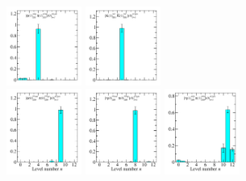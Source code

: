 \begin{figure}
  \includegraphics[width=0.22\textwidth]{figures/spectrum_a1gm/with_tq/zfactors/zfactor_isotriplet_phi_pion-A1gm_1-P001-A2p-SS_1-P00-1-A2m-SS_1.pdf}
  \includegraphics[width=0.22\textwidth]{figures/spectrum_a1gm/with_tq/zfactors/zfactor_isotriplet_kaon_kbar-A1gm_1-P001-A2-SS_1-P00-1-A2-SS_1.pdf}\\
  \includegraphics[width=0.22\textwidth]{figures/spectrum_a1gm/with_tq/zfactors/zfactor_isotriplet_phi_pion-A1gm_1-P000-T1um-SS_0-P000-T1up-SS_0.pdf}
  \includegraphics[width=0.22\textwidth]{figures/spectrum_a1gm/with_tq/zfactors/zfactor_isotriplet_eta_pion-A1gm_1-P000-T1um-SS_0-P000-T1up-SS_0.pdf}
  \includegraphics[width=0.22\textwidth]{figures/spectrum_a1gm/with_tq/zfactors/zfactor_isotriplet_eta_pion-A1gm_1-P001-A2p-SS_0-P00-1-A2m-SS_0.pdf}\\

\end{figure}
